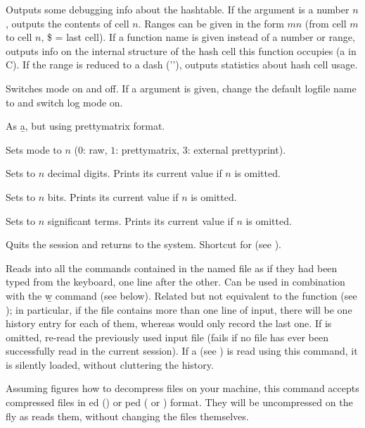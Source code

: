  Outputs some debugging info about the
hashtable. If the argument is a number $n$, outputs the contents of cell
$n$. Ranges can be given in the form $m$\kbd{-}$n$ (from cell $m$ to cell
$n$, \$ = last cell). If a function name is given instead of a number or
range, outputs info on the internal structure of the hash cell this
function occupies (a  in C). If the range is reduced to
a dash ('\kbd{-}'), outputs statistics about hash cell usage.

 Switches  mode on and off.
If a  argument is given, change the default logfile name to
 and switch log mode on.

 As \b{a}, but using prettymatrix format.

 Sets  mode to $n$ ($0$: raw, $1$:
prettymatrix, $3$: external prettyprint).

 Sets  to $n$ decimal digits.
Prints its current value if $n$ is omitted.

 Sets  to $n$ bits.
Prints its current value if $n$ is omitted.

 Sets  to $n$ significant terms.
Prints its current value if $n$ is omitted.

 Quits the  session and returns to the system.
Shortcut for \kbd{()} (see ).

 Reads into  all the
commands contained in the named file as if they had been typed from the
keyboard, one line after the other. Can be used in combination with the \b{w}
command (see below). Related but not equivalent to the function 
(see ); in particular, if the file contains more than one
line of input, there will be one history entry for each of them, whereas
 would only record the last one. If  is omitted,
re-read the previously used input file (fails if no file has ever been
successfully read in the current session). If a  
(see ) is read using this command, it is silently loaded,
without cluttering the history.

Assuming  figures how to decompress files on your machine, this
command accepts compressed files in ed () or
ped ( or ) format. They will be uncompressed on
the fly as  reads them, without changing the files themselves.

